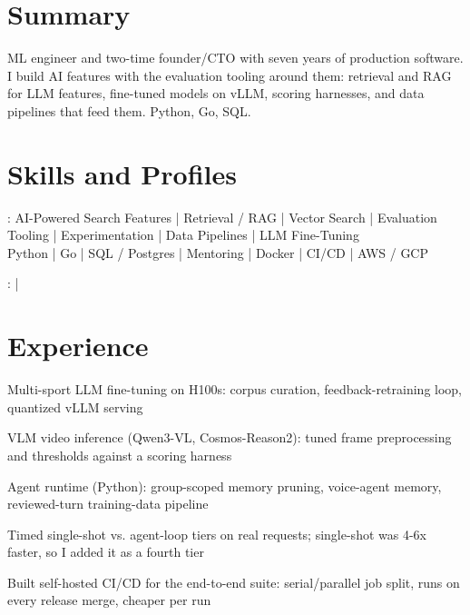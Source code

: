 \documentclass[print]{jack-resume}
\begin{document}
\pagecolor{darkmodeBackground}


\begin{minipage}[t][1cm][t]{.03\textwidth}
    \hfill
\end{minipage}

\section{Summary}
ML engineer and two-time founder/CTO with seven years of production software. I build AI features with the evaluation tooling around them: retrieval and RAG for LLM features, fine-tuned models on vLLM, scoring harnesses, and data pipelines that feed them. Python, Go, SQL.
\sectionsep

\section{Skills and Profiles}
:
AI-Powered Search Features \hfill | \hfill
Retrieval / RAG \hfill | \hfill
Vector Search \hfill | \hfill
Evaluation Tooling \hfill | \hfill
Experimentation \hfill | \hfill
Data Pipelines \hfill | \hfill
LLM Fine-Tuning \\
\hspace{1.0cm} Python \hfill | \hfill
Go \hfill | \hfill
SQL / Postgres \hfill | \hfill
Mentoring \hfill | \hfill
Docker \hfill | \hfill
CI/CD \hfill | \hfill
AWS / GCP \\

\raggedright{
    :
      \href{https://www.linkedin.com/in/jack-sturtevant/}{ \ExternalLink} |
     \href{https://github.com/jacksturt}{ \ExternalLink}}

\section{Experience}

\begin{tightemize}
    \item Multi-sport LLM fine-tuning on H100s: corpus curation, feedback-retraining loop, quantized vLLM serving
    \item VLM video inference (Qwen3-VL, Cosmos-Reason2): tuned frame preprocessing and thresholds against a scoring harness
    \item Agent runtime (Python): group-scoped memory pruning, voice-agent memory, reviewed-turn training-data pipeline
    \item Timed single-shot vs. agent-loop tiers on real requests; single-shot was 4-6x faster, so I added it as a fourth tier
    \item Built self-hosted CI/CD for the end-to-end suite: serial/parallel job split, runs on every release merge, cheaper per run
\end{tightemize}
\sectionsep
\end{document}
